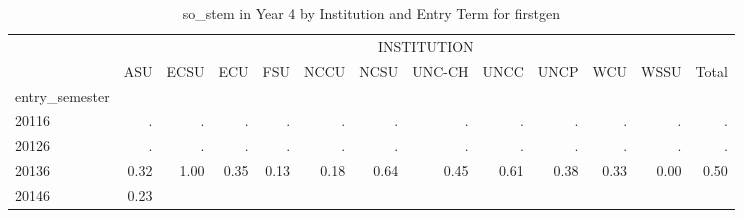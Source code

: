 \begin{table}[!h]
\caption{so\_stem in Year 4 by Institution and Entry Term for firstgen}
\centering
\begin{tabular}{lllllllllllll}
\cline{1-13}
\multicolumn{1}{c}{} &
  \multicolumn{12}{|c}{INSTITUTION} \\
\multicolumn{1}{c}{} &
  \multicolumn{1}{|r}{ASU} &
  \multicolumn{1}{r}{ECSU} &
  \multicolumn{1}{r}{ECU} &
  \multicolumn{1}{r}{FSU} &
  \multicolumn{1}{r}{NCCU} &
  \multicolumn{1}{r}{NCSU} &
  \multicolumn{1}{r}{UNC-CH} &
  \multicolumn{1}{r}{UNCC} &
  \multicolumn{1}{r}{UNCP} &
  \multicolumn{1}{r}{WCU} &
  \multicolumn{1}{r}{WSSU} &
  \multicolumn{1}{r}{Total} \\
\cline{1-13}
\multicolumn{1}{l}{entry\_semester} &
  \multicolumn{1}{|r}{} &
  \multicolumn{1}{r}{} &
  \multicolumn{1}{r}{} &
  \multicolumn{1}{r}{} &
  \multicolumn{1}{r}{} &
  \multicolumn{1}{r}{} &
  \multicolumn{1}{r}{} &
  \multicolumn{1}{r}{} &
  \multicolumn{1}{r}{} &
  \multicolumn{1}{r}{} &
  \multicolumn{1}{r}{} &
  \multicolumn{1}{r}{} \\
\multicolumn{1}{l}{\hspace{1em}20116} &
  \multicolumn{1}{|r}{.} &
  \multicolumn{1}{r}{.} &
  \multicolumn{1}{r}{.} &
  \multicolumn{1}{r}{.} &
  \multicolumn{1}{r}{.} &
  \multicolumn{1}{r}{.} &
  \multicolumn{1}{r}{.} &
  \multicolumn{1}{r}{.} &
  \multicolumn{1}{r}{.} &
  \multicolumn{1}{r}{.} &
  \multicolumn{1}{r}{.} &
  \multicolumn{1}{r}{.} \\
\multicolumn{1}{l}{\hspace{1em}20126} &
  \multicolumn{1}{|r}{.} &
  \multicolumn{1}{r}{.} &
  \multicolumn{1}{r}{.} &
  \multicolumn{1}{r}{.} &
  \multicolumn{1}{r}{.} &
  \multicolumn{1}{r}{.} &
  \multicolumn{1}{r}{.} &
  \multicolumn{1}{r}{.} &
  \multicolumn{1}{r}{.} &
  \multicolumn{1}{r}{.} &
  \multicolumn{1}{r}{.} &
  \multicolumn{1}{r}{.} \\
\multicolumn{1}{l}{\hspace{1em}20136} &
  \multicolumn{1}{|r}{0.32} &
  \multicolumn{1}{r}{1.00} &
  \multicolumn{1}{r}{0.35} &
  \multicolumn{1}{r}{0.13} &
  \multicolumn{1}{r}{0.18} &
  \multicolumn{1}{r}{0.64} &
  \multicolumn{1}{r}{0.45} &
  \multicolumn{1}{r}{0.61} &
  \multicolumn{1}{r}{0.38} &
  \multicolumn{1}{r}{0.33} &
  \multicolumn{1}{r}{0.00} &
  \multicolumn{1}{r}{0.50} \\
\multicolumn{1}{l}{\hspace{1em}20146} &
  \multicolumn{1}{|r}{0.23} &
  \multicolumn{1}{r}{} &

\end{tabular}
\end{table}
